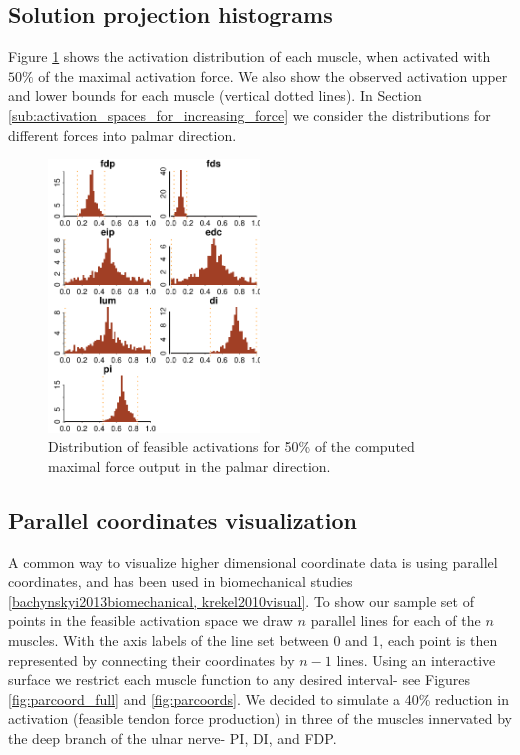 \subsection{Solution projection histograms}
Figure \ref{fig:raw_histograms} shows the activation distribution of each muscle, when activated with $50\%$ of the maximal activation force. We also show the observed activation upper and lower bounds for each muscle (vertical dotted lines).
In Section \ref{sub:activation_spaces_for_increasing_force} we consider the distributions for different forces into palmar direction.
\begin{figure}[!htbp]
\centering
\includegraphics[width=0.5\textwidth]{figs/raw_histograms.pdf}
\caption{Distribution of feasible activations for 50\% of the computed maximal force output in the palmar direction.}
\label{fig:raw_histograms}
\end{figure}

\subsection{Parallel coordinates visualization}
A common way to visualize higher dimensional coordinate data is using parallel coordinates, and has been used in biomechanical studies \ref{bachynskyi2013biomechanical, krekel2010visual}.
To show our sample set of points in the feasible activation space we draw $n$ parallel lines for each of the $n$ muscles.
With the axis labels of the line set between 0 and 1, each point is then represented by connecting their coordinates by $n-1$ lines.
Using an interactive surface we restrict each muscle function to any desired interval- see Figures \ref{fig:parcoord_full} and \ref{fig:parcoords}.
We decided to simulate a 40\% reduction in activation (feasible tendon force production) in three of the muscles innervated by the deep branch of the ulnar nerve- PI, DI, and FDP. 

